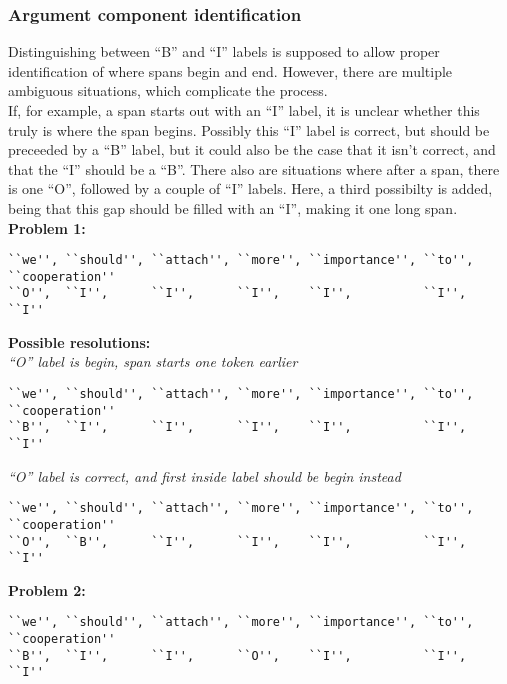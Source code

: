 \documentclass[12]{article}
\theoremstyle{mytheoremstyle}
\theoremstyle{mytheoremstyle}
\theoremstyle{myproblemstyle}
\begin{document}
  \subsubsection{Argument component identification} \label{aci-prob}
  Distinguishing between ``B'' and ``I'' labels is supposed to allow proper identification of where spans begin and end. 
  However, there are multiple ambiguous situations, which complicate the process. \\
  If, for example, a span starts out with an ``I'' label, it is unclear whether this truly is where the span begins. 
  Possibly this ``I'' label is correct, but should be preceeded by a ``B'' label, but it could also be the case that it isn't correct, and that the ``I'' should be a ``B''. 
  There also are situations where after a span, there is one ``O'', followed by a couple of ``I'' labels. 
  Here, a third possibilty is added, being that this gap should be filled with an ``I'', making it one long span.
  \vspace{2ex} \\
  \textbf{Problem 1:}
  \vspace{-1.5ex}
  \begin{verbatim}
``we'', ``should'', ``attach'', ``more'', ``importance'', ``to'', ``cooperation''
``O'',  ``I'',      ``I'',      ``I'',    ``I'',          ``I'',  ``I''
  \end{verbatim}
  \vspace{-4ex}
  \textbf{Possible resolutions:}\\
  \textit{``O'' label is begin, span starts one token earlier}
  \vspace{-1.5ex}
  \begin{verbatim}
``we'', ``should'', ``attach'', ``more'', ``importance'', ``to'', ``cooperation''
``B'',  ``I'',      ``I'',      ``I'',    ``I'',          ``I'',  ``I''
  \end{verbatim}
  \vspace{-4ex}
  \textit{``O'' label is correct, and first inside label should be begin instead}
  \vspace{-1.5ex}
  \begin{verbatim}
``we'', ``should'', ``attach'', ``more'', ``importance'', ``to'', ``cooperation''
``O'',  ``B'',      ``I'',      ``I'',    ``I'',          ``I'',  ``I''
  \end{verbatim}
  \vspace{-2ex}
  \textbf{Problem 2:}
  \vspace{-1.5ex}
  \begin{verbatim}
``we'', ``should'', ``attach'', ``more'', ``importance'', ``to'', ``cooperation''
``B'',  ``I'',      ``I'',      ``O'',    ``I'',          ``I'',  ``I''
  \end{verbatim}
\end{document}
